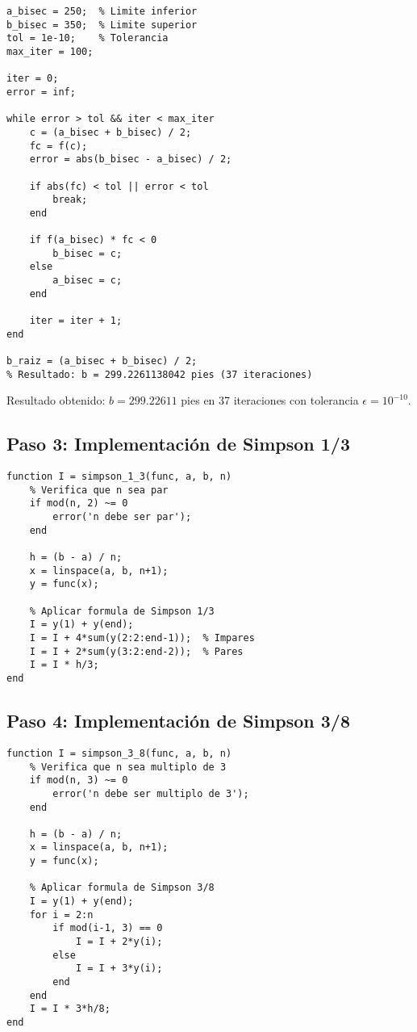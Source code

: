 \documentclass[conference]{IEEEtran}
\begin{document}
\begin{lstlisting}[caption={Implementación del Método de Bisección}]
% Metodo de Biseccion
a_bisec = 250;  % Limite inferior
b_bisec = 350;  % Limite superior
tol = 1e-10;    % Tolerancia
max_iter = 100;

iter = 0;
error = inf;

while error > tol && iter < max_iter
    c = (a_bisec + b_bisec) / 2;
    fc = f(c);
    error = abs(b_bisec - a_bisec) / 2;
    
    if abs(fc) < tol || error < tol
        break;
    end
    
    if f(a_bisec) * fc < 0
        b_bisec = c;
    else
        a_bisec = c;
    end
    
    iter = iter + 1;
end

b_raiz = (a_bisec + b_bisec) / 2;
% Resultado: b = 299.2261138042 pies (37 iteraciones)
\end{lstlisting}

Resultado obtenido: $b = 299.22611$ pies en 37 iteraciones con tolerancia $\epsilon = 10^{-10}$.

\subsection{Paso 3: Implementación de Simpson 1/3}

\begin{lstlisting}[caption={Función del método Simpson 1/3}]
function I = simpson_1_3(func, a, b, n)
    % Verifica que n sea par
    if mod(n, 2) ~= 0
        error('n debe ser par');
    end
    
    h = (b - a) / n;
    x = linspace(a, b, n+1);
    y = func(x);
    
    % Aplicar formula de Simpson 1/3
    I = y(1) + y(end);
    I = I + 4*sum(y(2:2:end-1));  % Impares
    I = I + 2*sum(y(3:2:end-2));  % Pares
    I = I * h/3;
end
\end{lstlisting}

\subsection{Paso 4: Implementación de Simpson 3/8}

\begin{lstlisting}[caption={Función del método Simpson 3/8}]
function I = simpson_3_8(func, a, b, n)
    % Verifica que n sea multiplo de 3
    if mod(n, 3) ~= 0
        error('n debe ser multiplo de 3');
    end
    
    h = (b - a) / n;
    x = linspace(a, b, n+1);
    y = func(x);
    
    % Aplicar formula de Simpson 3/8
    I = y(1) + y(end);
    for i = 2:n
        if mod(i-1, 3) == 0
            I = I + 2*y(i);
        else
            I = I + 3*y(i);
        end
    end
    I = I * 3*h/8;
end
\end{lstlisting}
\end{document}
